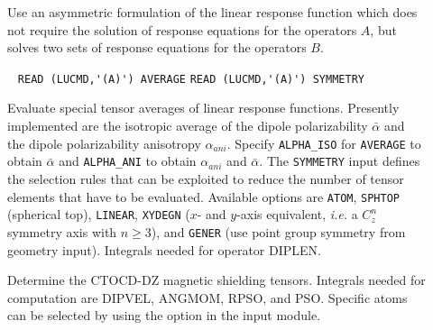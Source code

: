 \begin{center}
\end{center}

\begin{description}
\item[] 
Use an asymmetric formulation of the linear response function which
does not require the solution of response equations for the operators $A$, 
but solves two sets of response equations for the operators $B$.
%
%
%
\item[] \verb| |\newline
   \verb|READ (LUCMD,'(A)') AVERAGE|\newline
   \verb|READ (LUCMD,'(A)') SYMMETRY|

Evaluate special tensor averages of linear response functions.
Presently implemented are the isotropic average of the dipole polarizability
$\bar{\alpha}$ and the dipole polarizability anisotropy $\alpha_{ani}$.
Specify \verb+ALPHA_ISO+ for \verb+AVERAGE+ to obtain $\bar{\alpha}$ and
\verb+ALPHA_ANI+ to obtain $\alpha_{ani}$ and $\bar{\alpha}$.
The \verb+SYMMETRY+ input defines the selection rules that can be
exploited to reduce the number of tensor elements that have to be
evaluated. Available options are
\verb+ATOM+, \verb+SPHTOP+ (spherical top), \verb+LINEAR+,
\verb+XYDEGN+ ($x$- and $y$-axis equivalent, {\it i.e.\/} a $C_z^n$
symmetry axis with $n \ge 3$),  and \verb+GENER+ (use point
group symmetry from geometry input).
Integrals needed for operator DIPLEN.

\item[]
Determine the CTOCD-DZ magnetic shielding tensors. Integrals 
needed for computation are DIPVEL, ANGMOM, RPSO, and PSO. Specific atoms can 
be selected by using the option  in the  input 
module.


\end{description}
